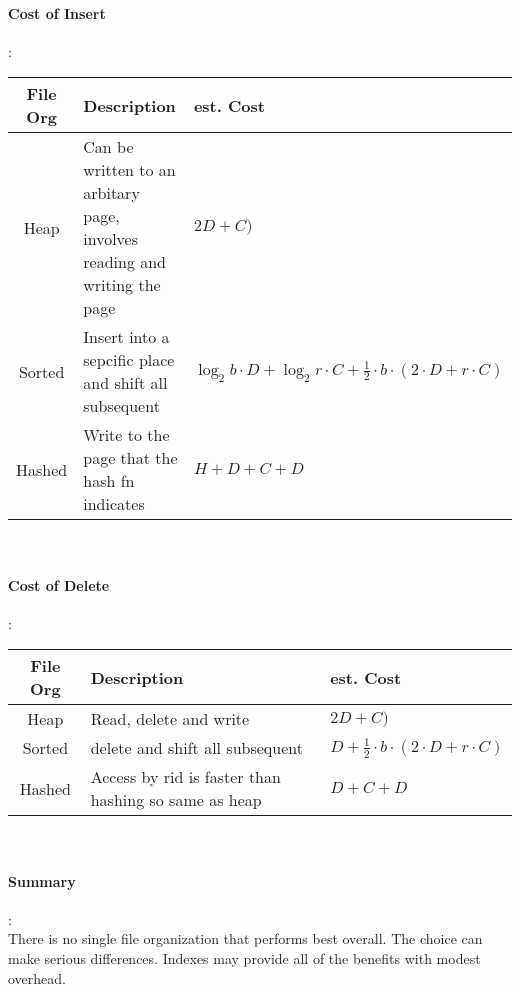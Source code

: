 \paragraph{Cost of Insert}:  \\ 
\begin{tabular}{|c|p{3cm}|p{3cm}|} \hline
     File Org & Description & est. Cost \\ \hline
     Heap & Can be written to an arbitary page, involves reading and writing the page & $2D + C)$ \\ \hline
     Sorted & Insert into a sepcific place and shift all subsequent  & $ \log_2 b \cdot D + \log_2 r \cdot C + \frac{1}{2} \cdot b \cdot (2 \cdot D + r \cdot C)$ \\ \hline
     Hashed & Write to the page that the hash fn indicates  & $ H+ D + C + D$ \\ \hline
\end{tabular} \\

\paragraph{Cost of Delete}:  \\ 
\begin{tabular}{|c|p{3cm}|p{3cm}|} \hline
     File Org & Description & est. Cost \\ \hline
     Heap & Read, delete and write & $2D + C)$ \\ \hline
     Sorted & delete and shift all subsequent  & $ D + \frac{1}{2} \cdot b \cdot (2 \cdot D + r \cdot C)$ \\ \hline
     Hashed & Access by rid is faster than hashing so same as heap & $  D + C + D$ \\ \hline
\end{tabular} \\

\paragraph{Summary}: \\
There is no single file organization that performs best overall. The choice can make serious differences. Indexes may provide all of the benefits with modest overhead.
